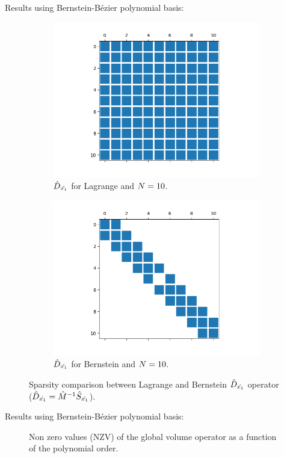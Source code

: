 \begin{frame}{Results using Bernstein-Bézier polynomial basis:}
\begin{figure}[htbp]
\begin{subfigure}{0.45\textwidth}
\centering
\includegraphics[scale=0.2]{image/dx_lag_10.png}
\caption{${{\hat{D}}_{\hat{x_1}}}$ for Lagrange and ${N}=10$.}
\end{subfigure}
\begin{subfigure}{0.45\textwidth}
\centering
\includegraphics[scale=0.2]{image/dx_bb_10.png}
\caption{${{\hat{D}}_{\hat{x_1}}}$ for Bernstein and ${N}=10$.}
\end{subfigure}
\caption{Sparsity comparison between Lagrange and Bernstein
${{\hat{D}}_{\hat{x_1}}}$ operator (${{\hat{D}}_{\hat{x_1}}} =  {\hat{M}}^{-1} {\hat{S}}_{\hat{x_1}}$).}
\label{dx_sparse_pattern}
\end{figure}
\end{frame}

\begin{frame}[noframenumbering]{Results using Bernstein-Bézier polynomial basis:}
\setlength{\plotwidth}{6.0cm}
\setlength{\plotheight}{4.5cm}
\begin{figure}[htbp]
\centering

  \caption{Non zero values (NZV) of the global volume operator as a function of the polynomial order.}
  \label{bb_lag_comp_1d}
\end{figure}

\end{frame}



